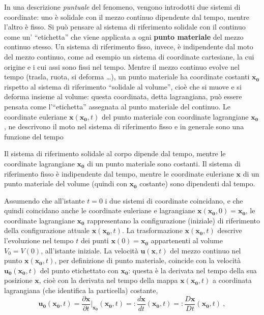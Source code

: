 In una descrizione \textit{puntuale} del fenomeno, vengono introdotti due sistemi di coordinate: uno è solidale con il mezzo continuo dipendente dal tempo, mentre l'altro è fisso. 
Si può pensare al sistema di riferimento solidale con il continuo come un' ``etichetta'' che viene applicata a ogni \textbf{punto materiale} del mezzo continuo stesso. Un sistema di riferimento fisso, invece, è indipendente dal moto del mezzo continuo, come ad esempio un sistema di coordinate cartesiane, la cui origine e i cui assi sono fissi nel tempo.
%
Mentre il mezzo continuo evolve nel tempo (trasla, ruota, si deforma \dots), un punto materiale ha coordinate costanti $\bm{x_0}$ rispetto al sistema di riferimento ``solidale al volume'', cioè che si muove e si deforma insieme al volume: questa coordinata, detta lagrangiana, può essere pensata come l'``etichetta'' assegnata al punto materiale del continuo. Le coordinate euleriane $\bm{x}(\bm{x_0},t)$ del punto materiale con coordinate lagrangiane $\bm{x_0}$, ne descrivono il moto nel sistema di riferimento fisso e in generale sono una funzione del tempo
%
\begin{remark}
 Il sistema di riferimento solidale al corpo dipende dal tempo, mentre le coordinate lagrangiane $\bm{x_0}$ di un punto materiale sono costanti.
 Il sistema di riferimento fisso è indipendente dal tempo, mentre le coordinate euleriane $\bm{x}$ di un punto materiale del volume (quindi con $\bm{x_0}$ costante) sono dipendenti dal tempo.
\end{remark}
% 
Assumendo che all'istante $t=0$ i due sistemi di coordinate coincidano, e che quindi coincidano anche le coordinate euleriane e lagrangiane $\bm{x}(\bm{x_0},0) = \bm{x_0}$, le coordinate lagrangiane $\bm{x_0}$ rappresentano la configurazione (iniziale) di riferimento della configurazione attuale $\bm{x}(\bm{x_0},t)$. La trasformazione $\bm{x}(\bm{x_0},t)$ descrive l'evoluzione nel tempo $t$ dei punti $\bm{x}(0) = \bm{x_0}$ appartenenti al volume $V_0 = V(0)$, all'istante iniziale. La velocità $\bm{u}(\bm{x},t)$ del mezzo continuo nel punto $\bm{x}(\bm{x_0},t)$, per definizione di punto materiale, coincide con la velocità $\bm{u_0}(\bm{x_0},t)$ del punto etichettato con $\bm{x_0}$: questa è la derivata nel tempo della sua posizione $\bm{x}$, cioè con la derivata nel tempo della mappa $\bm{x}(\bm{x_0},t)$ a coordinata lagrangiana (che identifica la particella) costante,
 \begin{equation}
  \bm{u_0}(\bm{x_0},t) = \dfrac{\partial \bm{x}}{\partial t}\bigg|_{\bm{x_0}}(\bm{x_0},t) =: \dfrac{d \bm{x}}{d t}(\bm{x_0},t) =: \dfrac{D\bm{x}}{D t}(\bm{x_0},t) \ ,
 \end{equation}
